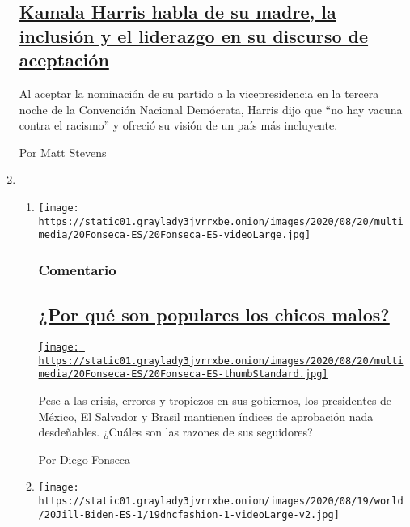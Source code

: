 \begin{enumerate}
{  \subsection{\texorpdfstring{\href{/es/2020/08/20/espanol/estados-unidos/kamala-harris-discurso-completo.html}{Kamala
  Harris habla de su madre, la inclusión y el liderazgo en su discurso
  de
  aceptación}}{Kamala Harris habla de su madre, la inclusión y el liderazgo en su discurso de aceptación}}\label{kamala-harris-habla-de-su-madre-la-inclusiuxf3n-y-el-liderazgo-en-su-discurso-de-aceptaciuxf3n}}

  Al aceptar la nominación de su partido a la vicepresidencia en la
  tercera noche de la Convención Nacional Demócrata, Harris dijo que
  ``no hay vacuna contra el racismo'' y ofreció su visión de un país más
  incluyente.

  Por Matt Stevens
\item
  \begin{enumerate}
  \def\labelenumii{\arabic{enumii}.}
  \item
    \texttt{[image: https://static01.graylady3jvrrxbe.onion/images/2020/08/20/multimedia/20Fonseca-ES/20Fonseca-ES-videoLarge.jpg]}

    \hypertarget{comentario}{%
    \subsubsection{Comentario}\label{comentario}}

    \hypertarget{por-quuxe9-son-populares-los-chicos-malos}{%
    \subsection{\texorpdfstring{\href{/es/2020/08/20/espanol/opinion/aprobacion-presidentes.html}{¿Por
    qué son populares los chicos
    malos?}}{¿Por qué son populares los chicos malos?}}\label{por-quuxe9-son-populares-los-chicos-malos}}

    \href{/es/2020/08/20/espanol/opinion/aprobacion-presidentes.html}{\texttt{[image: https://static01.graylady3jvrrxbe.onion/images/2020/08/20/multimedia/20Fonseca-ES/20Fonseca-ES-thumbStandard.jpg]}}

    Pese a las crisis, errores y tropiezos en sus gobiernos, los
    presidentes de México, El Salvador y Brasil mantienen índices de
    aprobación nada desdeñables. ¿Cuáles son las razones de sus
    seguidores?

    Por Diego Fonseca
  \item
    \texttt{[image: https://static01.graylady3jvrrxbe.onion/images/2020/08/19/world/20Jill-Biden-ES-1/19dncfashion-1-videoLarge-v2.jpg]}


\end{enumerate}
\end{enumerate}
